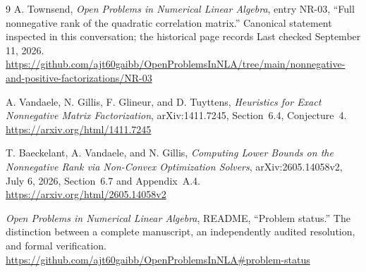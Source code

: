 \documentclass[11pt]{article}
\begin{document}
\begin{thebibliography}{9}
A. Townsend, \emph{Open Problems in Numerical Linear Algebra}, entry NR-03, ``Full nonnegative rank of the quadratic correlation matrix.'' Canonical statement inspected in this conversation; the historical page records Last checked September 11, 2026.\newline
\url{https://github.com/ajt60gaibb/OpenProblemsInNLA/tree/main/nonnegative-and-positive-factorizations/NR-03}

A. Vandaele, N. Gillis, F. Glineur, and D. Tuyttens, \emph{Heuristics for Exact Nonnegative Matrix Factorization}, arXiv:1411.7245, Section~6.4, Conjecture~4.\newline
\url{https://arxiv.org/html/1411.7245}

T. Baeckelant, A. Vandaele, and N. Gillis, \emph{Computing Lower Bounds on the Nonnegative Rank via Non-Convex Optimization Solvers}, arXiv:2605.14058v2, July 6, 2026, Section~6.7 and Appendix~A.4.\newline
\url{https://arxiv.org/html/2605.14058v2}

\emph{Open Problems in Numerical Linear Algebra}, README, ``Problem status.'' The distinction between a complete manuscript, an independently audited resolution, and formal verification.\newline
\url{https://github.com/ajt60gaibb/OpenProblemsInNLA#problem-status}
\end{thebibliography}
\end{document}
